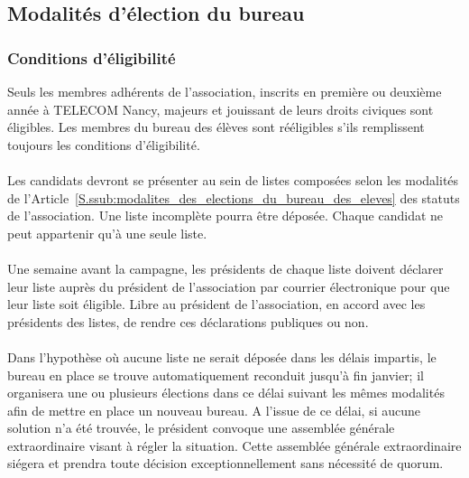 \documentclass{article} %
\begin{document}
		\subsection{Modalités d'élection du bureau}
\label{sub:modalites_d_election_du_bureau}

			\subsubsection{Conditions d'éligibilité}
\label{ssub:conditions_d_eligibilite}

				Seuls les membres adhérents de l'association, inscrits en
				première ou deuxième année à TELECOM Nancy, majeurs et jouissant
				de leurs droits civiques sont éligibles. Les membres du bureau
				des élèves sont rééligibles s’ils remplissent toujours les
				conditions d’éligibilité.

                \paragraph{}
				Les candidats devront se présenter au sein de listes composées
				selon les modalités de
				l’Article~\ref{S.ssub:modalites_des_elections_du_bureau_des_eleves}
				des statuts de l’association. Une liste incomplète pourra être
				déposée. Chaque candidat ne peut appartenir qu’à une seule
				liste.

                \paragraph{}
				Une semaine avant la campagne, les présidents de chaque liste
				doivent déclarer leur liste auprès du président de l’association
				par courrier électronique pour que leur liste soit éligible.
				Libre au président de l’association, en accord avec les
				présidents des listes, de rendre ces déclarations publiques ou
				non.

                \paragraph{}
				Dans l’hypothèse où aucune liste ne serait déposée dans les
				délais impartis, le bureau en place se trouve automatiquement
				reconduit jusqu’à fin janvier; il organisera une ou plusieurs
				élections dans ce délai suivant les mêmes modalités afin de
				mettre en place un nouveau bureau. A l’issue de ce délai, si
				aucune solution n’a été trouvée, le président convoque une
				assemblée générale extraordinaire visant à régler la situation.
				Cette assemblée générale extraordinaire siégera et prendra toute
				décision exceptionnellement sans nécessité de quorum.
\end{document}
